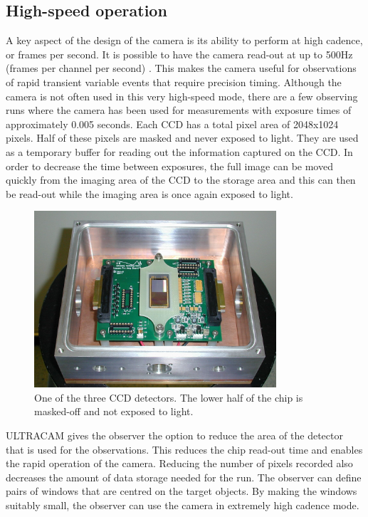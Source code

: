 \subsection{High-speed operation}
A key aspect of the design of the camera is its ability to perform at high cadence, or frames per second. It is possible to have the camera read-out at up to 500Hz (frames per channel per second) \citet{dhillon07}. This makes the camera useful for observations of rapid transient variable events that require precision timing. Although the camera is not often used in this very high-speed mode, there are a few observing runs where the camera has been used for measurements with exposure times of approximately 0.005 seconds. Each CCD has a total pixel area of 2048x1024 pixels. Half of these pixels are masked and never exposed to light. They are used as a temporary buffer for reading out the information captured on the CCD. In order to decrease the time between exposures, the full image can be moved quickly from the imaging area of the CCD to the storage area and this can then be read-out while the imaging area is once again exposed to light. 

\begin{figure}
\centering
\includegraphics[width=90mm]{images/ccd.png}
\caption{One of the three CCD detectors. The lower half of the chip is masked-off and not exposed to light.}
\label{fig2}
\end{figure}

ULTRACAM gives the observer the option to reduce the area of the detector that is used for the observations. This reduces the chip read-out time and enables the rapid operation of the camera. Reducing the number of pixels recorded also decreases the amount of data storage needed for the run. The observer can define pairs of windows that are centred on the target objects. By making the windows suitably small, the observer can use the camera in extremely high cadence mode. 

